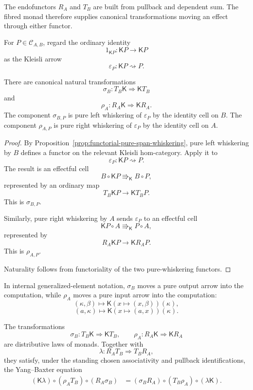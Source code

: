 The endofunctors \(R_A\) and \(T_B\) are built from pullback and dependent
sum.  The fibred monad therefore supplies canonical transformations moving
an effect through either functor.

For \(P\in\mathcal C_{A,B}\), regard the ordinary identity
\[
    1_{\mathsf K P}:
    \mathsf K P\longrightarrow\mathsf K P
\]
as the Kleisli arrow
\[
    \varepsilon_P:
    \mathsf K P\rightsquigarrow P.
\]

\begin{proposition}
\label{prop:canonical-effect-transformations}
There are canonical natural transformations
\[
    \sigma_B:
    T_B\mathsf K
    \Longrightarrow
    \mathsf KT_B
\]
and
\[
    \rho_A:
    R_A\mathsf K
    \Longrightarrow
    \mathsf KR_A.
\]
The component \(\sigma_{B,P}\) is pure left whiskering of
\(\varepsilon_P\) by the identity cell on \(B\).  The component
\(\rho_{A,P}\) is pure right whiskering of \(\varepsilon_P\) by the identity
cell on \(A\).
\end{proposition}

\begin{proof}
By Proposition~\ref{prop:functorial-pure-span-whiskering}, pure left
whiskering by \(B\) defines a functor on the relevant Kleisli hom-category.
Apply it to
\[
    \varepsilon_P:\mathsf KP\rightsquigarrow P.
\]
The result is an effectful cell
\[
    B\circ\mathsf KP
    \Rrightarrow_{\mathsf K}
    B\circ P,
\]
represented by an ordinary map
\[
    T_B\mathsf KP
    \longrightarrow
    \mathsf KT_BP.
\]
This is \(\sigma_{B,P}\).

Similarly, pure right whiskering by \(A\) sends \(\varepsilon_P\) to an
effectful cell
\[
    \mathsf KP\circ A
    \Rrightarrow_{\mathsf K}
    P\circ A,
\]
represented by
\[
    R_A\mathsf KP
    \longrightarrow
    \mathsf KR_AP.
\]
This is \(\rho_{A,P}\).

Naturality follows from functoriality of the two pure-whiskering functors.
\end{proof}

In internal generalized-element notation, \(\sigma_B\) moves a pure output
arrow into the computation, while \(\rho_A\) moves a pure input arrow into
the computation:
\[
    (\kappa,\beta)
    \longmapsto
    \mathsf K(x\mapsto(x,\beta))(\kappa),
\]
\[
    (a,\kappa)
    \longmapsto
    \mathsf K(x\mapsto(a,x))(\kappa).
\]

\begin{theorem}
\label{thm:canonical-iterated-distributive-laws}
The transformations
\[
    \sigma_B:T_B\mathsf K\Rightarrow\mathsf KT_B,
    \qquad
    \rho_A:R_A\mathsf K\Rightarrow\mathsf KR_A
\]
are distributive laws of monads.  Together with
\[
    \lambda:R_AT_B\Rightarrow T_BR_A,
\]
they satisfy, under the standing chosen associativity and pullback
identifications, the Yang--Baxter equation
\[
\begin{aligned}
    (\mathsf K\lambda)
    \circ
    (\rho_AT_B)
    \circ
    (R_A\sigma_B)
    &=
    (\sigma_BR_A)
    \circ
    (T_B\rho_A)
    \circ
    (\lambda\mathsf K).
\end{aligned}
\]
\end{theorem}

